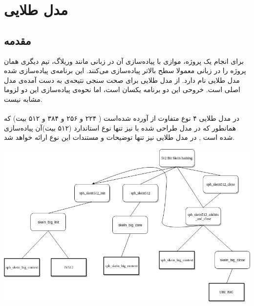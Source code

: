 \chapter{مدل طلایی}
\label{chapter:GoldenModel}
\section{مقدمه}
برای ‌انجام یک پروژه، موازی با پیاده‌سازی آن در زبانی مانند وریلاگ،‌ تیم دیگری همان پروژه را در زبانی معمولا سطح بالاتر پیاده‌سازی می‌کنند. این برنامه‌ی پیاده‌سازی شده مدل‌ طلایی نام دارد. از مدل طلایی برای صحت‌ سنجی نتیحه‌ی به دست آمده‌ی مدل اصلی است. خروحی این دو برنامه یکسان است، اما نحوه‌ی پیاده‌سازی این دو لزوما مشابه نیست.
\\ \\
در مدل‌ طلایی ۴ نوع متفاوت از  آورده شده‌است (‌ ۲۲۴ و ۲۵۶ و ۳۸۴ و ۵۱۲  بیت) که همانطور که در مدل  طراحی شده با  نیز تنها نوع استاندارد  (۵۱۲ بیت)آن پیاده‌سازی شده است , در مدل‌ طلایی نیز تنها توضیحات و مستندات این نوع ارائه خواهد شد.
\\
\begin{center}
	\includegraphics[width=16cm]{images/GoldenModelDocumentation/GoldenModel.png}
\end{center}

